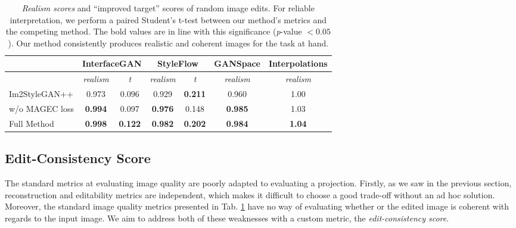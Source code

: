 

\begin{table}
\centering
\begin{tabular}{|l|c|c|c|c|c|c|}
\hline
               & \multicolumn{2}{c|}{ InterfaceGAN} & \multicolumn{2}{c|}{ StyleFlow} &  GANSpace &  Interpolations \\ \hline
               &  \textit{realism}      &  \textit{t}         &  \textit{realism}    &  \textit{t}        &  \textit{realism}  &  \textit{realism}        \\ \hline
 Im2StyleGAN++  &  0.973                 &  0.096     &  0.929               &  \textbf{0.211}    &  0.960             &  1.00           \\ \hline
 w/o MAGEC loss &  \textbf{0.994}        &  0.097              &  \textbf{0.976}      &  0.148             &  \textbf{0.985}    &  1.03                    \\ \hline
 Full Method    &  \textbf{0.998}        &  \textbf{0.122}     &  \textbf{0.982}      &  \textbf{0.202}    &  \textbf{0.984}    &  \textbf{1.04}           \\ \hline
\end{tabular}\caption{ \emph{Realism scores} and ``improved target'' scores of random image edits. For reliable interpretation, we perform a paired Student's t-test between our method's metrics and the competing method. The bold values are in line with this significance (\emph{p}-value $< 0.05$). Our method consistently produces realistic and coherent images for the task at hand.}\label{tab:standard_metrics}
\end{table}




\subsection{Edit-Consistency Score}

The standard metrics at evaluating image quality are poorly adapted to evaluating a 
projection. Firstly, as we saw in the previous section, reconstruction and editability 
metrics are independent, which makes it difficult to choose a good trade-off without an 
ad hoc solution. Moreover, the standard image quality metrics presented in Tab. \ref{tab:standard_metrics}
have no way of evaluating whether or the edited image is coherent with regards to the input image. 
We aim to address both of these weaknesses with a custom metric, the \emph{edit-consistency score}.
 

